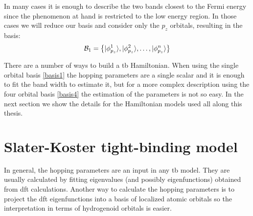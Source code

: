 In many cases it is enough to describe the two bands closest to the Fermi energy since the phenomenon at hand is restricted to the low energy region. In those cases we will reduce our basis and consider only the $p_z$ orbitals, resulting in the basis:
\begin{equation}
  \mathcal{B}_1 = \left\{|\phi^1_{p_z}\rangle, |\phi^2_{p_z}\rangle,\dots, |\phi^n_{p_z}\rangle\right\}
\label{basis1}
\end{equation}
\medskip

There are a number of ways to build a \acf{tb} Hamiltonian. When using the single orbital basis \eqref{basis1} the hopping parameters are a single scalar and it is enough to fit the band width to estimate it, but for a more complex description using the four orbital basis \eqref{basis4} the estimation of the parameters is not so easy. In the next section we show the details for the Hamiltonian models used all along this thesis.


\section{Slater-Koster tight-binding model}
\label{ssec:SK}
In general, the hopping parameters are an input in any \acf{tb} model. They are usually calculated by fitting eigenvalues (and possibly eigenfunctions) obtained from \ac{dft} calculations. Another way to calculate the hopping parameters is to project the \ac{dft} eigenfunctions into a basis of localized atomic orbitals so the interpretation in terms of hydrogenoid orbitals is easier.

